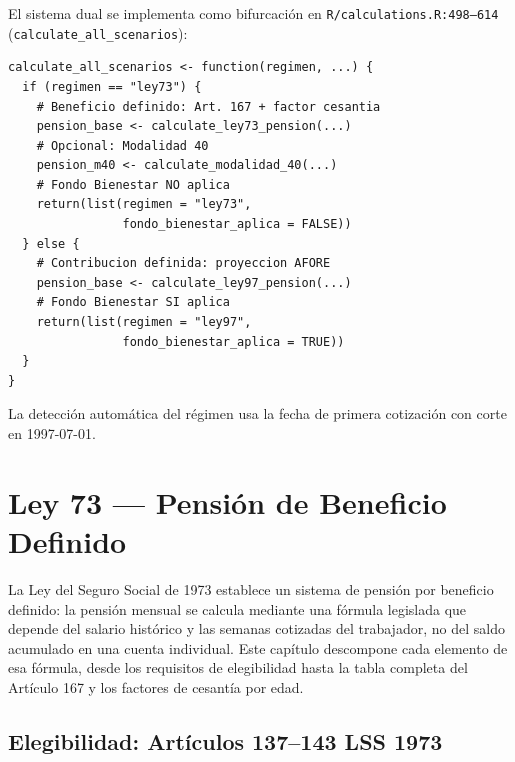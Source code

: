\documentclass[11pt,a4paper]{report}
\begin{document}
\begin{tcolorbox}[colback=orange!5!white, colframe=orange!75!black, title=\textbf{Aplicaci\'on en C\'odigo}]
El sistema dual se implementa como bifurcaci\'on en \texttt{R/calculations.R:498--614} (\texttt{calculate\_all\_scenarios}):

\begin{lstlisting}
calculate_all_scenarios <- function(regimen, ...) {
  if (regimen == "ley73") {
    # Beneficio definido: Art. 167 + factor cesantia
    pension_base <- calculate_ley73_pension(...)
    # Opcional: Modalidad 40
    pension_m40 <- calculate_modalidad_40(...)
    # Fondo Bienestar NO aplica
    return(list(regimen = "ley73",
                fondo_bienestar_aplica = FALSE))
  } else {
    # Contribucion definida: proyeccion AFORE
    pension_base <- calculate_ley97_pension(...)
    # Fondo Bienestar SI aplica
    return(list(regimen = "ley97",
                fondo_bienestar_aplica = TRUE))
  }
}
\end{lstlisting}

La detecci\'on autom\'atica del r\'egimen usa la fecha de primera cotizaci\'on con corte en 1997-07-01.
\end{tcolorbox}

\chapter{Ley 73 --- Pensi\'on de Beneficio Definido}

La Ley del Seguro Social de 1973 establece un sistema de pensi\'on por beneficio definido: la pensi\'on mensual se calcula mediante una f\'ormula legislada que depende del salario hist\'orico y las semanas cotizadas del trabajador, no del saldo acumulado en una cuenta individual. Este cap\'itulo descompone cada elemento de esa f\'ormula, desde los requisitos de elegibilidad hasta la tabla completa del Art\'iculo 167 y los factores de cesant\'ia por edad.

\section{Elegibilidad: Art\'iculos 137--143 LSS 1973}
\end{document}
